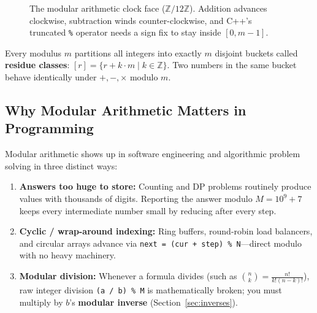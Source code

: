 \documentclass[11pt,a4paper]{article}
\theoremstyle{definition}
\begin{document}
\begin{figure}[htbp]
\caption{The modular arithmetic clock face ($\mathbb{Z}/12\mathbb{Z}$). Addition advances clockwise, subtraction winds counter-clockwise, and C++'s truncated \texttt{\%} operator needs a sign fix to stay inside $[0, m - 1]$.}
\label{fig:mod-clock}
\end{figure}

Every modulus $m$ partitions all integers into exactly $m$ disjoint buckets called \textbf{residue classes}: $[r] = \{r + k \cdot m \mid k \in \mathbb{Z}\}$. Two numbers in the same bucket behave identically under $+, -, \times$ modulo $m$.

\subsection{Why Modular Arithmetic Matters in Programming}

Modular arithmetic shows up in software engineering and algorithmic problem solving in three distinct ways:
\begin{enumerate}
    \item \textbf{Answers too huge to store:} Counting and DP problems routinely produce values with thousands of digits. Reporting the answer modulo $M = 10^9 + 7$ keeps every intermediate number small by reducing after every step.
    \item \textbf{Cyclic / wrap-around indexing:} Ring buffers, round-robin load balancers, and circular arrays advance via \texttt{next = (cur + step) \% N}---direct modulo with no heavy machinery.
    \item \textbf{Modular division:} Whenever a formula divides (such as $\binom{n}{k} = \frac{n!}{k!(n-k)!}$), raw integer division \texttt{(a / b) \% M} is mathematically broken; you must multiply by $b$'s \textbf{modular inverse} (Section~\ref{sec:inverses}).
\end{enumerate}
\end{document}
